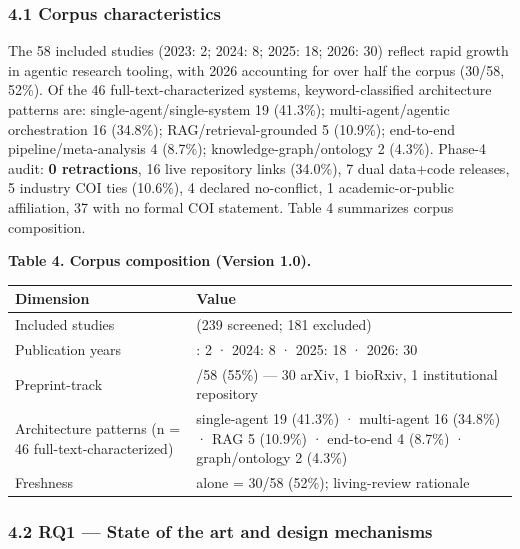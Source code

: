 \documentclass[11pt]{article}
\newcounter{none} %
\begin{document}
\subsubsection{4.1 Corpus characteristics}\label{corpus-characteristics}

The 58 included studies (2023: 2; 2024: 8; 2025: 18; 2026: 30) reflect
rapid growth in agentic research tooling, with 2026 accounting for over
half the corpus (30/58, 52\%). Of the 46 full-text-characterized
systems, keyword-classified architecture patterns are:
single-agent/single-system 19 (41.3\%); multi-agent/agentic
orchestration 16 (34.8\%); RAG/retrieval-grounded 5 (10.9\%); end-to-end
pipeline/meta-analysis 4 (8.7\%); knowledge-graph/ontology 2 (4.3\%).
Phase-4 audit: \textbf{0 retractions}, 16 live repository links
(34.0\%), 7 dual data+code releases, 5 industry COI ties (10.6\%), 4
declared no-conflict, 1 academic-or-public affiliation, 37 with no
formal COI statement. Table 4 summarizes corpus composition.

\textbf{Table 4. Corpus composition (Version 1.0).}

{\def\LTcaptype{none} %
\begin{longtable}[]{@{}
  >{\raggedright\arraybackslash}p{}
  >{\raggedright\arraybackslash}p{}@{}}
\toprule\noalign{}
\begin{minipage}[b]{\linewidth}\raggedright
Dimension
\end{minipage} & \begin{minipage}[b]{\linewidth}\raggedright
Value
\end{minipage} \\
\midrule\noalign{}
\endhead
\bottomrule\noalign{}
\endlastfoot
Included studies & 58 (239 screened; 181 excluded) \\
Publication years & 2023: 2 · 2024: 8 · 2025: 18 · 2026: 30 \\
Preprint-track & 32/58 (55\%) --- 30 arXiv, 1 bioRxiv, 1 institutional
repository \\
Architecture patterns (n = 46 full-text-characterized) & single-agent 19
(41.3\%) · multi-agent 16 (34.8\%) · RAG 5 (10.9\%) · end-to-end 4
(8.7\%) · graph/ontology 2 (4.3\%) \\
Freshness & 2026 alone = 30/58 (52\%); living-review rationale \\
\end{longtable}
}

\subsubsection{4.2 RQ1 --- State of the art and design
mechanisms}\label{rq1-state-of-the-art-and-design-mechanisms}
\end{document}
